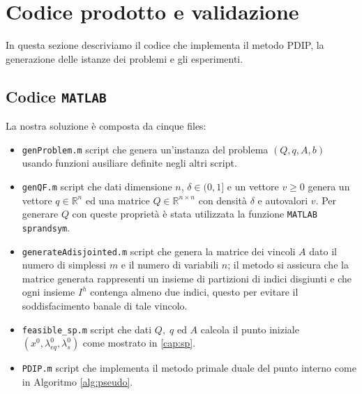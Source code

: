 
\section{Codice prodotto e validazione}
In questa sezione descriviamo il codice che implementa il metodo PDIP, la generazione delle istanze dei problemi e gli esperimenti.

\subsection{Codice \texttt{MATLAB}}
La nostra soluzione è composta da cinque files:

\begin{itemize}
    \item \texttt{genProblem.m} script che genera un'instanza del problema $(Q,q,A,b)$ usando funzioni ausiliare definite negli altri script.
    \item \texttt{genQF.m} script che dati dimensione $n$, $\delta \in (0,1]$ e un vettore $v\geq0$ genera un vettore $q\in\mathbb{R}^n$ ed una matrice $Q \in \mathbb{R}^{n \times n}$ con densità $\delta$ e autovalori $v$.
    Per generare $Q$ con queste proprietà è stata utilizzata la funzione \texttt{MATLAB} \texttt{sprandsym}.
    
   \item \texttt{generateAdisjointed.m} script che genera la matrice dei vincoli $A$ dato il numero di simplessi $m$ e il numero di variabili $n$; il metodo si assicura che la matrice generata rappresenti un insieme di partizioni di indici disgiunti e che ogni insieme $I^h$ contenga almeno due indici, questo per evitare il soddisfacimento banale di tale vincolo.
    \item \texttt{feasible\_sp.m} script che dati $Q, \;q$ ed $A$ calcola il punto iniziale $(x^0, \lambda_{eq}^0, \lambda_s^0)$ come mostrato in \ref{cap:sp}.
    
    \item \texttt{PDIP.m} script che implementa il metodo primale duale del punto interno come in Algoritmo \ref{alg:pseudo}.
    
\end{itemize}

